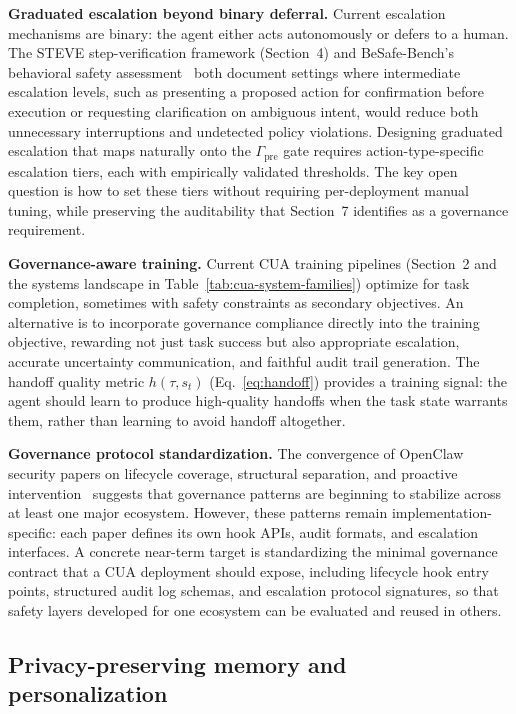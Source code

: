 \smallskip
\noindent\textbf{Graduated escalation beyond binary deferral.}
Current escalation mechanisms are binary: the agent either acts autonomously or defers to a human. The STEVE step-verification framework (Section~4) and BeSafe-Bench's behavioral safety assessment~\cite{steve2025,besafebench2026} both document settings where intermediate escalation levels, such as presenting a proposed action for confirmation before execution or requesting clarification on ambiguous intent, would reduce both unnecessary interruptions and undetected policy violations. Designing graduated escalation that maps naturally onto the $\Gamma_{\text{pre}}$ gate requires action-type-specific escalation tiers, each with empirically validated thresholds. The key open question is how to set these tiers without requiring per-deployment manual tuning, while preserving the auditability that Section~7 identifies as a governance requirement.

\smallskip
\noindent\textbf{Governance-aware training.}
Current CUA training pipelines (Section~2 and the systems landscape in Table~\ref{tab:cua-system-families}) optimize for task completion, sometimes with safety constraints as secondary objectives. An alternative is to incorporate governance compliance directly into the training objective, rewarding not just task success but also appropriate escalation, accurate uncertainty communication, and faithful audit trail generation. The handoff quality metric $h(\tau, s_t)$ (Eq.~\ref{eq:handoff}) provides a training signal: the agent should learn to produce high-quality handoffs when the task state warrants them, rather than learning to avoid handoff altogether.

\smallskip
\noindent\textbf{Governance protocol standardization.}
The convergence of OpenClaw security papers on lifecycle coverage, structural separation, and proactive intervention~\cite{tamingopenclaw2026,openclawprism2026,agentprivsep2026,clawkeeper2026} suggests that governance patterns are beginning to stabilize across at least one major ecosystem. However, these patterns remain implementation-specific: each paper defines its own hook APIs, audit formats, and escalation interfaces. A concrete near-term target is standardizing the minimal governance contract that a CUA deployment should expose, including lifecycle hook entry points, structured audit log schemas, and escalation protocol signatures, so that safety layers developed for one ecosystem can be evaluated and reused in others.

\subsection{Privacy-preserving memory and personalization}
\label{sec:future-memory}

